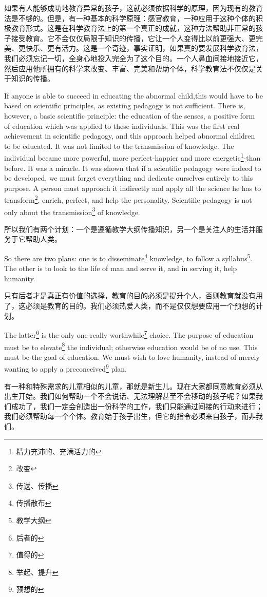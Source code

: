 \documentclass[lang=cn,10pt]{elegantbook}
\begin{document}
如果有人能够成功地教育异常的孩子，这就必须依据科学的原理，因为现有的教育法是不够的。但是，有一种基本的科学原理：感官教育，一种应用于这种个体的积极教育形式。这是在科学教育法上的第一个真正的成就，这种方法帮助非正常的孩子接受教育。它不会仅仅局限于知识的传播，它让一个人变得比以前更强大、更完美、更快乐、更有活力。这是一个奇迹，事实证明，如果真的要发展科学教育法，我们必须忘记一切，全身心地投入完全为了这个目的。一个人鼻血间接地接近它，然后应用他所拥有的科学来改变、丰富、完美和帮助个体，科学教育法不仅仅是关于知识的传播。

If anyone is able to succeed in educating the abnormal child,this would have to be based on scientific principles, as existing pedagogy is not sufficient. There is, however, a basic scientific principle: the education of the senses, a positive form of education which was applied to these individuals. This was the first real achievement in scientific pedagogy, and this approach helped abnormal children to be educated. It was not limited to the transmission of knowledge. The individual became more powerful, more perfect-happier and more energetic\footnote{精力充沛的、充满活力的}-than before. It was a miracle. It was shown that if a scientific pedagogy were indeed to be developed, we must forget everything and dedicate ourselves entirely to this purpose. A person must approach it indirectly and apply all the science he has to transform\footnote{改变}, enrich, perfect, and help the personality. Scientific pedagogy is not only about the transmission\footnote{传送、传播} of knowledge.

所以我们有两个计划：一个是遵循教学大纲传播知识，另一个是关注人的生活并服务于它帮助人类。

So there are two plans: one is to disseminate\footnote{传播散布} knowledge, to follow a syllabus\footnote{教学大纲}. The other is to look to the life of man and serve it, and in serving it, help humanity.

只有后者才是真正有价值的选择，教育的目的必须是提升个人，否则教育就没有用了，这必须是教育的目的。我们必须热爱人类，而不是仅仅想要应用一个预想的计划。

The latter\footnote{后者的} is the only one really worthwhile\footnote{值得的} choice. The purpose of education must be to elevate\footnote{举起、提升} the individual; otherwise education would be of no use. This must be the goal of education. We must wish to love humanity, instead of merely wanting to apply a preconceived\footnote{预想的} plan.

有一种和特殊需求的儿童相似的儿童，那就是新生儿。现在大家都同意教育必须从出生开始。我们如何帮助一个不会说话、无法理解甚至不会移动的孩子呢？如果我们成功了，我们一定会创造出一份科学的工作，我们只能通过间接的行动来进行；我们必须帮助每一个个体。教育始于孩子出生，但它的指令必须来自孩子，而非我们。
\end{document}
